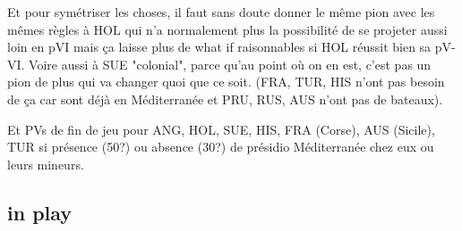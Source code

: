 \begin{todo}
  Et pour symétriser les choses, il faut sans doute donner le même pion
  avec les mêmes règles à HOL qui n'a normalement plus la possibilité de
  se projeter aussi loin en pVI mais ça laisse plus de what if
  raisonnables si HOL réussit bien sa pV-VI. Voire aussi à SUE
  "colonial", parce qu'au point où on en est, c'est pas un pion de plus
  qui va changer quoi que ce soit. (FRA, TUR, HIS n'ont pas besoin de ça
  car sont déjà en Méditerranée et PRU, RUS, AUS n'ont pas de bateaux).

  Et PVs de fin de jeu pour ANG, HOL, SUE, HIS, FRA (Corse), AUS
  (Sicile), TUR si présence (50?) ou absence (30?) de présidio
  Méditerranée chez eux ou leurs mineurs.
\end{todo}

\subsection{ in play}
